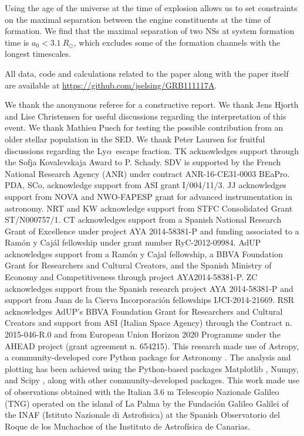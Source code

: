 \documentclass[referee]{aa}
\newcommand{\lya}{Ly$\alpha$}
\begin{document}
Using the age of the universe at the time of explosion allows us to set
constraints on the maximal separation between the engine constituents at the
time of formation. We find that the maximal separation of two NSs at system
formation time is $a_0 < 3.1~R_\odot$, which excludes some of the formation
channels with the longest timescales.

All data, code and calculations related to the paper along with the
paper itself are available at \url{https://github.com/jselsing/GRB111117A}.

\begin{acknowledgements}
We thank the anonymous referee for a constructive report. 
%
We thank Jens Hjorth and Lise Christensen for useful discussions regarding the interpretation of this event. We thank Mathieu Puech for testing the possible contribution from an older stellar population in the SED. We thank Peter Laursen for fruitful discussions regarding the \lya~escape fraction.
%	
TK acknowledges support through the Sofja Kovalevskaja Award to P. Schady.
%
SDV is supported by the French National Research Agency (ANR) under contract ANR-16-CE31-0003 BEaPro.
%
PDA, SCo, acknowledge support from ASI grant I/004/11/3.
%
JJ acknowledges support from NOVA and NWO-FAPESP grant for advanced
instrumentation in astronomy.
%
NRT and KW acknowledge support from STFC Consolidated
Grant ST/N000757/1.
%
CT acknowledges support from a Spanish National Research Grant of Excellence
under project AYA 2014-58381-P and funding associated to a Ramón y Cajál
fellowship under grant number RyC-2012-09984.
%
AdUP acknowledges support from a Ramón y Cajal fellowship, a BBVA Foundation
Grant for Researchers and Cultural Creators, and the Spanish Ministry of Economy
and Competitiveness through project AYA2014-58381-P.
%
ZC acknowledges support from the Spanish research project AYA 2014-58381-P and
support from Juan de la Cierva Incorporaci\'on fellowships IJCI-2014-21669.
%
RSR acknowledges AdUP's BBVA Foundation Grant for Researchers and Cultural
Creators and support from ASI (Italian Space Agency) through the Contract n. 2015-046-R.0 and from European Union Horizon 2020 Programme under the AHEAD project (grant agreement n. 654215).
%
This research made use of Astropy, a community-developed core Python package for Astronomy \citep{TheAstropyCollaboration2013}. The analysis and plotting has been achieved using the Python-based packages Matplotlib \citep{Hunter2007}, Numpy, and Scipy \citep{VanderWalt2011}, along with other community-developed packages.
%
This work made use of observations obtained with the Italian 3.6 m Telescopio Nazionale Galileo (TNG) operated on the island of La Palma by the Fundaci\'on Galileo Galilei of the INAF (Istituto Nazionale di Astrofisica) at the Spanish Observatorio del Roque de los Muchachos of the Instituto de Astrof\'isica de Canarias.

\end{acknowledgements}
\end{document}
